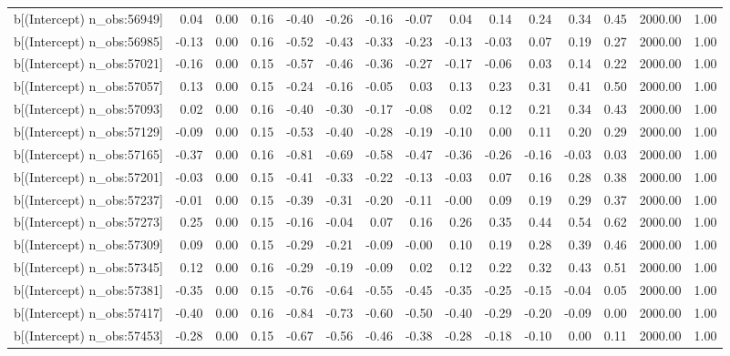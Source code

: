 \begin{table}[ht]
\begin{tabular}{rrrrrrrrrrrrrrr}
  b[(Intercept) n\_obs:56949] & 0.04 & 0.00 & 0.16 & -0.40 & -0.26 & -0.16 & -0.07 & 0.04 & 0.14 & 0.24 & 0.34 & 0.45 & 2000.00 & 1.00 \\ 
  b[(Intercept) n\_obs:56985] & -0.13 & 0.00 & 0.16 & -0.52 & -0.43 & -0.33 & -0.23 & -0.13 & -0.03 & 0.07 & 0.19 & 0.27 & 2000.00 & 1.00 \\ 
  b[(Intercept) n\_obs:57021] & -0.16 & 0.00 & 0.15 & -0.57 & -0.46 & -0.36 & -0.27 & -0.17 & -0.06 & 0.03 & 0.14 & 0.22 & 2000.00 & 1.00 \\ 
  b[(Intercept) n\_obs:57057] & 0.13 & 0.00 & 0.15 & -0.24 & -0.16 & -0.05 & 0.03 & 0.13 & 0.23 & 0.31 & 0.41 & 0.50 & 2000.00 & 1.00 \\ 
  b[(Intercept) n\_obs:57093] & 0.02 & 0.00 & 0.16 & -0.40 & -0.30 & -0.17 & -0.08 & 0.02 & 0.12 & 0.21 & 0.34 & 0.43 & 2000.00 & 1.00 \\ 
  b[(Intercept) n\_obs:57129] & -0.09 & 0.00 & 0.15 & -0.53 & -0.40 & -0.28 & -0.19 & -0.10 & 0.00 & 0.11 & 0.20 & 0.29 & 2000.00 & 1.00 \\ 
  b[(Intercept) n\_obs:57165] & -0.37 & 0.00 & 0.16 & -0.81 & -0.69 & -0.58 & -0.47 & -0.36 & -0.26 & -0.16 & -0.03 & 0.03 & 2000.00 & 1.00 \\ 
  b[(Intercept) n\_obs:57201] & -0.03 & 0.00 & 0.15 & -0.41 & -0.33 & -0.22 & -0.13 & -0.03 & 0.07 & 0.16 & 0.28 & 0.38 & 2000.00 & 1.00 \\ 
  b[(Intercept) n\_obs:57237] & -0.01 & 0.00 & 0.15 & -0.39 & -0.31 & -0.20 & -0.11 & -0.00 & 0.09 & 0.19 & 0.29 & 0.37 & 2000.00 & 1.00 \\ 
  b[(Intercept) n\_obs:57273] & 0.25 & 0.00 & 0.15 & -0.16 & -0.04 & 0.07 & 0.16 & 0.26 & 0.35 & 0.44 & 0.54 & 0.62 & 2000.00 & 1.00 \\ 
  b[(Intercept) n\_obs:57309] & 0.09 & 0.00 & 0.15 & -0.29 & -0.21 & -0.09 & -0.00 & 0.10 & 0.19 & 0.28 & 0.39 & 0.46 & 2000.00 & 1.00 \\ 
  b[(Intercept) n\_obs:57345] & 0.12 & 0.00 & 0.16 & -0.29 & -0.19 & -0.09 & 0.02 & 0.12 & 0.22 & 0.32 & 0.43 & 0.51 & 2000.00 & 1.00 \\ 
  b[(Intercept) n\_obs:57381] & -0.35 & 0.00 & 0.15 & -0.76 & -0.64 & -0.55 & -0.45 & -0.35 & -0.25 & -0.15 & -0.04 & 0.05 & 2000.00 & 1.00 \\ 
  b[(Intercept) n\_obs:57417] & -0.40 & 0.00 & 0.16 & -0.84 & -0.73 & -0.60 & -0.50 & -0.40 & -0.29 & -0.20 & -0.09 & 0.00 & 2000.00 & 1.00 \\ 
  b[(Intercept) n\_obs:57453] & -0.28 & 0.00 & 0.15 & -0.67 & -0.56 & -0.46 & -0.38 & -0.28 & -0.18 & -0.10 & 0.00 & 0.11 & 2000.00 & 1.00 \\ 

\end{tabular}
\end{table}
